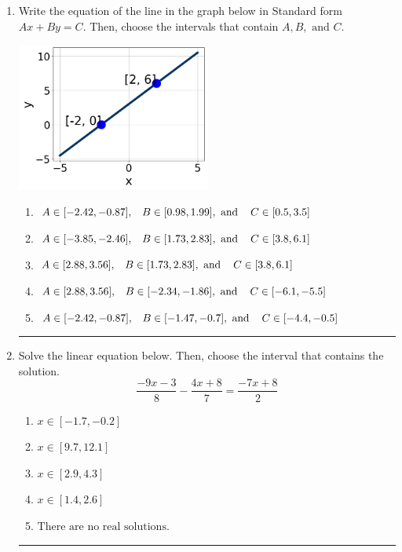 \documentclass[14pt]{extbook}
\newcommand{\litem}[1]{\item#1\hspace*{-1cm}\rule{\textwidth}{0.4pt}}
\begin{document}
\begin{enumerate}
{\begin{enumerate}[label=\Alph*.]
\end{enumerate} }
\litem{
Write the equation of the line in the graph below in Standard form $Ax+By=C$. Then, choose the intervals that contain $A, B, \text{ and } C$.
\begin{center}
    \includegraphics[width=0.5\textwidth]{../Figures/linearGraphToStandardB.png}
\end{center}
\begin{enumerate}[label=\Alph*.]
\item \( A \in [-2.42, -0.87], \hspace{3mm} B \in [0.98, 1.99], \text{ and } \hspace{3mm} C \in [0.5, 3.5] \)
\item \( A \in [-3.85, -2.46], \hspace{3mm} B \in [1.73, 2.83], \text{ and } \hspace{3mm} C \in [3.8, 6.1] \)
\item \( A \in [2.88, 3.56], \hspace{3mm} B \in [1.73, 2.83], \text{ and } \hspace{3mm} C \in [3.8, 6.1] \)
\item \( A \in [2.88, 3.56], \hspace{3mm} B \in [-2.34, -1.86], \text{ and } \hspace{3mm} C \in [-6.1, -5.5] \)
\item \( A \in [-2.42, -0.87], \hspace{3mm} B \in [-1.47, -0.7], \text{ and } \hspace{3mm} C \in [-4.4, -0.5] \)

\end{enumerate} }
\litem{
Solve the linear equation below. Then, choose the interval that contains the solution.\[ \frac{-9x -3}{8} - \frac{4x + 8}{7} = \frac{-7x + 8}{2} \]\begin{enumerate}[label=\Alph*.]
\item \( x \in [-1.7, -0.2] \)
\item \( x \in [9.7, 12.1] \)
\item \( x \in [2.9, 4.3] \)
\item \( x \in [1.4, 2.6] \)
\item \( \text{There are no real solutions.} \)


\end{enumerate}}
\end{enumerate}
\end{document}
